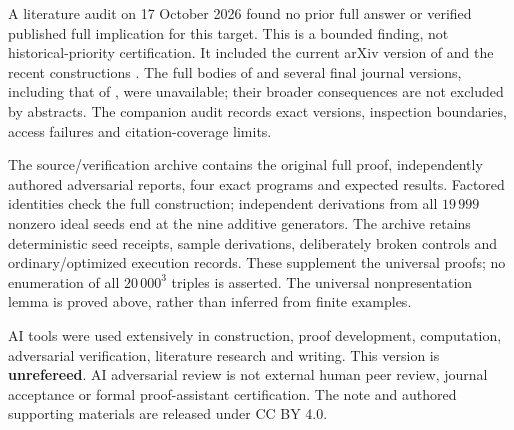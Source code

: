 \documentclass[11pt]{article}
\begin{document}
A literature audit on 17 October 2026 found no prior full answer or
verified published full implication for this target. This is a bounded
finding, not historical-priority certification. It included the current
arXiv version of \cite{CO} and the recent constructions
\cite{DameleKT,DameleIB}. The full bodies of \cite{Rump2020,Rump2022}
and several final journal versions, including that of \cite{CO}, were
unavailable; their broader consequences are not excluded by abstracts.
The companion audit records exact versions, inspection boundaries,
access failures and citation-coverage limits.

The source/verification archive contains the original full proof,
independently authored adversarial reports, four exact programs and
expected results. Factored identities check the full construction;
independent derivations from all $19\,999$ nonzero ideal seeds end
at the nine additive generators. The archive retains deterministic
seed receipts, sample derivations, deliberately broken controls and
ordinary/optimized execution records. These supplement the universal
proofs; no enumeration of all $20\,000^3$ triples is asserted.
The universal nonpresentation lemma is proved above, rather than
inferred from finite examples.

AI tools were used extensively in construction, proof development,
computation, adversarial verification, literature research and writing.
This version is \textbf{unrefereed}. AI adversarial review is not external
human peer review, journal acceptance or formal proof-assistant
certification. The note and authored supporting materials are released
under CC BY 4.0.
\end{document}
